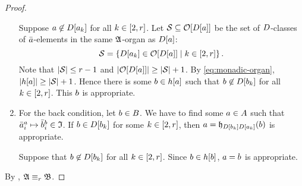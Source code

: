 \begin{proof}
\begin{enumerate}
  Suppose $a \not\in D[a_{k}]$ for all $k \in [2,r]$.
  Let $\mathcal{S} \subseteq \mathcal{O}[D[a]]$ be the set of $D$-classes of
  $\bar{a}$-elements in the same $\mathfrak{A}$-organ as $D[a]$:
  \[
    \mathcal{S} = \left\{D[a_{k}] \in \mathcal{O}[D[a]]\mathrel{}\middle|\mathrel{}k \in [2,r]\right\}.
  \]
  Note that $\left|\mathcal{S}\right| \leq r-1$ and
  $\left|\mathcal{O}[D[a]]\right| \geq \left|\mathcal{S}\right| + 1$.
  By \cref{eq:monadic-organ}, $\left|h[a]\right| \geq \left|\mathcal{S}\right| + 1$.
  Hence there is some $b \in h[a]$ such that $b \not\in
  D[b_{k}]$ for all $k \in [2,r]$. This $b$ is appropriate.
  \item For the back condition, let $b \in B$.
  We have to find some $a \in A$ such that
  $\bar{a}_{i}^{a} \mapsto \bar{b}_{i}^{b} \in \mathfrak{I}$.
  If $b \in D[b_{k}]$ for some $k \in [2,r]$,
  then $a = \mathfrak{h}_{D[b_{k}]D[a_{k}]}(b)$ is appropriate.
  
  Suppose that $b \not\in D[b_{k}]$ for all $k \in [2,r]$.
  Since $b \in h[b]$, $a = b$ is appropriate.
\end{enumerate}
By , $\mathfrak{A} \equiv_{r} \mathfrak{B}$.
\end{proof}